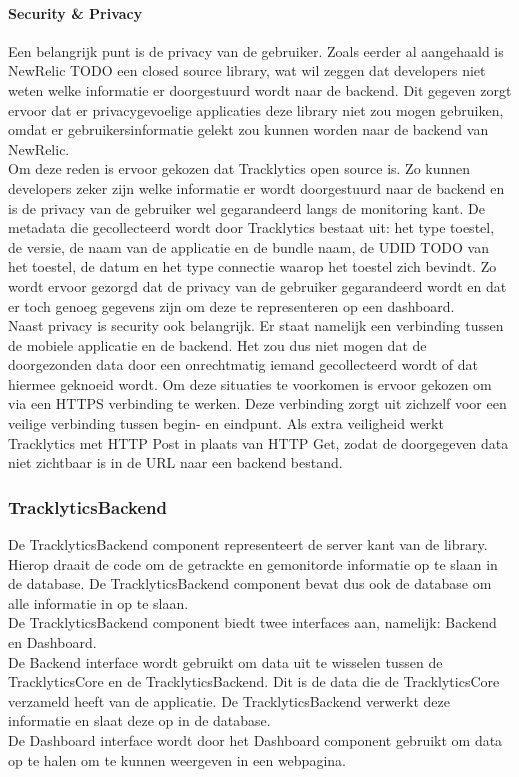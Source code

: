 \paragraph{Security \& Privacy}
Een belangrijk punt is de privacy van de gebruiker. Zoals eerder al aangehaald is NewRelic {TODO} een closed source library, wat wil zeggen dat developers niet weten welke informatie er doorgestuurd wordt naar de backend. Dit gegeven zorgt ervoor dat er privacygevoelige applicaties deze library niet zou mogen gebruiken, omdat er gebruikersinformatie gelekt zou kunnen worden naar de backend van NewRelic.\\
Om deze reden is ervoor gekozen dat Tracklytics open source is. Zo kunnen developers zeker zijn welke informatie er wordt doorgestuurd naar de backend en is de privacy van de gebruiker wel gegarandeerd langs de monitoring kant. De metadata die gecollecteerd wordt door Tracklytics bestaat uit: het type toestel, de versie, de naam van de applicatie en de bundle naam, de UDID {TODO} van het toestel, de datum en het type connectie waarop het toestel zich bevindt. Zo wordt ervoor gezorgd dat de privacy van de gebruiker gegarandeerd wordt en dat er toch genoeg gegevens zijn om deze te representeren op een dashboard.\\

Naast privacy is security ook belangrijk. Er staat namelijk een verbinding tussen de mobiele applicatie en de backend. Het zou dus niet mogen dat de doorgezonden data door een onrechtmatig iemand gecollecteerd wordt of dat hiermee geknoeid wordt. Om deze situaties te voorkomen is ervoor gekozen om via een HTTPS verbinding te werken. Deze verbinding zorgt uit zichzelf voor een veilige verbinding tussen begin- en eindpunt. Als extra veiligheid werkt Tracklytics met HTTP Post in plaats van HTTP Get, zodat de doorgegeven data niet zichtbaar is in de URL naar een backend bestand.




\subsubsection{TracklyticsBackend}
De TracklyticsBackend component representeert de server kant van de library. Hierop draait de code om de getrackte en gemonitorde informatie op te slaan in de database. De TracklyticsBackend component bevat dus ook de database om alle informatie in op te slaan. \\
De TracklyticsBackend component biedt twee interfaces aan, namelijk: Backend en Dashboard.\\
De Backend interface wordt gebruikt om data uit te wisselen tussen de TracklyticsCore en de TracklyticsBackend. Dit is de data die de TracklyticsCore verzameld heeft van de applicatie. De TracklyticsBackend verwerkt deze informatie en slaat deze op in de database.\\
De Dashboard interface wordt door het Dashboard component gebruikt om data op te halen om te kunnen weergeven in een webpagina. 

